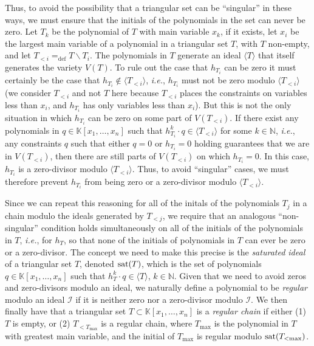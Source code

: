 Thus, to avoid the possibility that a triangular set can be ``singular'' in these ways, we must ensure that
the initials of the polynomials in the set can never be zero. Let $T_k$ be the polynomial of $T$ with main
variable $x_k$, if it exists, let $x_i$ be the largest main variable of 
a polynomial in a triangular set $T$, with $T$ non-empty, and let $T_{<i}=_{\mathrm{def}}T\backslash T_{i}$.
The polynomials in $T$ generate an ideal $\langle T\rangle$ that itself generates the variety $V(T)$.
To rule out the case that $h_{T_i}$ can be zero it must
certainly be the case that $h_{T_{i}}\nin\langle T_{<i}\rangle$,
\emph{i.e.}, $h_{T_{i}}$ must not be zero modulo $\langle
T_{<i}\rangle$ (we consider $T_{<i}$ and not $T$ here because $T_{<i}$ places the constraints on variables
less than $x_i$, and $h_{T_i}$ has only variables less than $x_i$). But this is not the only situation in which $h_{T_i}$ can be zero on some part of $V(T_{<i})$.
If there exist any
polynomials in $q\in\mathbb{K}[x_1,\ldots,x_n]$ such that
$h_{T_{i}}^k\cdot q\in\langle T_{<i}\rangle$ for some $k\in\mathbb{N}$,
\emph{i.e.}, any constraints $q$ such that either $q=0$ or
$h_{T_{i}}=0$ holding guarantees that we are in $V(T_{<i})$, then there
are still parts of $V(T_{<i})$ on which $h_{T_{i}}=0$. In this case,
$h_{T_{i}}$ is a zero-divisor modulo $\langle T_{<i}\rangle$. Thus, to
avoid ``singular'' cases, we must therefore prevent $h_{T_{i}}$ from being zero or
a zero-divisor modulo $\langle T_{<i}\rangle$.
%

Since we can repeat this reasoning for all of the initals of the polynomials $T_{j}$ in a chain modulo the ideals generated by $T_{<{j}}$, we require that an analogous ``non-singular'' condition holds simultaneously on all of the initials of the polynomials in $T$, \emph{i.e.}, for $h_{T}$, so that none of the initials of polynomials in $T$ can ever be zero or a zero-divisor.
The concept we need to make this precise is the \emph{saturated ideal} of a triangular set $T$, denoted $\mbox{{\rm sat}$(T)$}$, which is the set of polynomials $q\in\mathbb{K}[x_1,\ldots,x_n]$ such that $h_T^k\cdot q\in\langle T\rangle$, $k\in\mathbb{N}$. Given that we need to avoid zeros and zero-divisors modulo an ideal,  we naturally define a polynomial to be \emph{regular} modulo an ideal $\mathcal{I}$ if it is neither zero nor a zero-divisor modulo $\mathcal{I}$. We then finally have that a triangular set $T\subset \mathbb{K}[x_1,\ldots,x_n]$ is a \emph{regular chain} if either (1) $T$ is empty, or (2) $T_{<T_{\textrm{max}}}$ is a regular chain, where $T_{\textrm{max}}$ is the polynomial in $T$ with greatest main variable, and the initial of $T_{\textrm{max}}$ is regular modulo $\mbox{{\rm sat}$(T_{<{\textrm{max}}})$}$.

